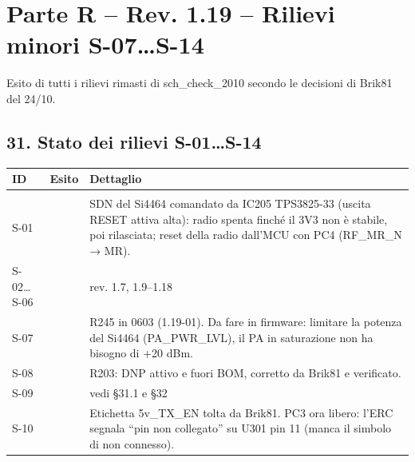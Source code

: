 \clearpage
\section[Parte R – Rev. 1.19 – Rilievi minori S-07…S-14]{Parte R – Rev. 1.19 – Rilievi minori S-07…S-14}

Esito di tutti i rilievi rimasti di sch\_\allowbreak{}check\_\allowbreak{}2010 secondo le decisioni di Brik81 del 24/\allowbreak{}10.

\subsection[31. Stato dei rilievi S-01…S-14]{31. Stato dei rilievi S-01…S-14}

{\small{}\setlength{\tabcolsep}{4pt}\renewcommand{\arraystretch}{1.1}
\begin{xltabular}{\linewidth}{>{\hsize\raggedright\arraybackslash}X>{\hsize\raggedright\arraybackslash}X>{\hsize\raggedright\arraybackslash}X}
\toprule
\textbf{ID} & \textbf{Esito} & \textbf{Dettaglio} \\
\midrule
\endhead
\midrule[0.15pt]\\\bottomrule\endfoot
\bottomrule\endlastfoot
S-01 &  & SDN del Si4464 comandato da IC205 TPS3825-33 (uscita RESET attiva alta): radio spenta finché il 3V3 non è stabile, poi rilasciata; reset della radio dall'MCU con PC4 (RF\_\allowbreak{}MR\_\allowbreak{}N → MR). \\\midrule[0.15pt]
S-02…S-06 &  & rev. 1.7, 1.9–1.18 \\\midrule[0.15pt]
S-07 &  & R245 in 0603 (1.19-01). Da fare in firmware: limitare la potenza del Si4464 (PA\_\allowbreak{}PWR\_\allowbreak{}LVL), il PA in saturazione non ha bisogno di +20 dBm. \\\midrule[0.15pt]
S-08 &  & R203: DNP attivo e fuori BOM, corretto da Brik81 e verificato. \\\midrule[0.15pt]
S-09 &  & vedi §31.1 e §32 \\\midrule[0.15pt]
S-10 &  & Etichetta 5v\_\allowbreak{}TX\_\allowbreak{}EN tolta da Brik81. PC3 ora libero: l'ERC segnala \textquotedblleft{}pin non collegato\textquotedblright{} su U301 pin 11 (manca il simbolo di non connesso). \\\midrule[0.15pt]

\end{xltabular}}
